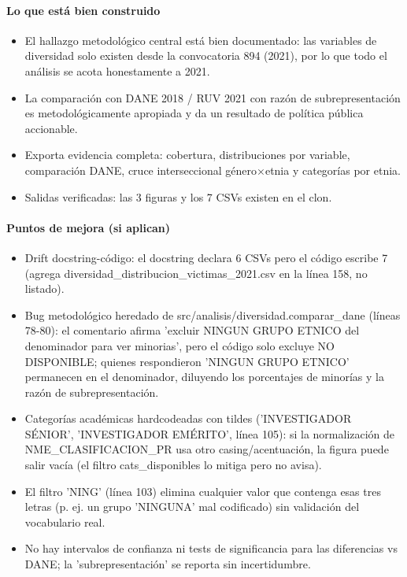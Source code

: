 \paragraph{Lo que está bien construido}
\begin{itemize}
  \item El hallazgo metodológico central está bien documentado: las variables de diversidad solo existen desde la convocatoria 894 (2021), por lo que todo el análisis se acota honestamente a 2021.
  \item La comparación con DANE 2018 / RUV 2021 con razón de subrepresentación es metodológicamente apropiada y da un resultado de política pública accionable.
  \item Exporta evidencia completa: cobertura, distribuciones por variable, comparación DANE, cruce interseccional género$\times$etnia y categorías por etnia.
  \item Salidas verificadas: las 3 figuras y los 7 CSVs existen en el clon.
\end{itemize}

\paragraph{Puntos de mejora (si aplican)}
\begin{itemize}
  \item Drift docstring-código: el docstring declara 6 CSVs pero el código escribe 7 (agrega diversidad\_distribucion\_victimas\_2021.csv en la línea 158, no listado).
  \item Bug metodológico heredado de src/analisis/diversidad.comparar\_dane (líneas 78-80): el comentario afirma 'excluir NINGUN GRUPO ETNICO del denominador para ver minorias', pero el código solo excluye NO DISPONIBLE; quienes respondieron 'NINGUN GRUPO ETNICO' permanecen en el denominador, diluyendo los porcentajes de minorías y la razón de subrepresentación.
  \item Categorías académicas hardcodeadas con tildes ('INVESTIGADOR SÉNIOR', 'INVESTIGADOR EMÉRITO', línea 105): si la normalización de NME\_CLASIFICACION\_PR usa otro casing/acentuación, la figura puede salir vacía (el filtro cats\_disponibles lo mitiga pero no avisa).
  \item El filtro 'NING' (línea 103) elimina cualquier valor que contenga esas tres letras (p. ej. un grupo 'NINGUNA' mal codificado) sin validación del vocabulario real.
  \item No hay intervalos de confianza ni tests de significancia para las diferencias vs DANE; la 'subrepresentación' se reporta sin incertidumbre.
\end{itemize}

